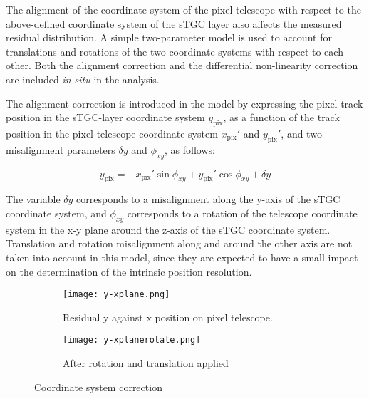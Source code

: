 The alignment of the coordinate system of the pixel telescope with respect to the above-defined coordinate system of the
sTGC layer also affects the measured residual distribution. A simple two-parameter model is used to account for
translations and rotations of the two coordinate systems with respect to each other. Both the alignment correction and
the differential non-linearity correction are included {\it in situ} in the analysis. \par

The alignment correction is introduced in the model by expressing the pixel track position in the sTGC-layer coordinate
system $y_{\mathrm{pix}}$, as a function of the track position in the pixel telescope coordinate system
$x_{\mathrm{pix}}'$ and $y_{\mathrm{pix}}'$, and two misalignment parameters $\delta y$ and $\phi_{xy}$, as follows:

\begin{equation}
	y_{\mathrm{pix}}=-x_{\mathrm{pix}}' \sin \phi_{xy} + y_{\mathrm{pix}}'\cos \phi_{xy}+\delta y
	\end{equation}

The variable $\delta y$ corresponds to a misalignment along the y-axis of the sTGC coordinate system, and $\phi_{xy}$
corresponds to a rotation of the telescope coordinate system in the x-y plane around the z-axis of the sTGC coordinate
system. Translation and rotation misalignment along and around the other axis are not taken into account in this model,
since they are expected to have a small impact on the determination of the intrinsic position resolution.\par

	\begin{figure}[ht]
		\centering
		\hspace*{\fill}
		\begin{subfigure}[b]{0.42\textwidth}
			\centering
			\texttt{[image: y-xplane.png]}
			\caption{Residual y against x position on pixel telescope.}\label{xyplanefit}
		\end{subfigure}
		\hfill
		\begin{subfigure}[b]{0.42\textwidth}
			\centering
			\texttt{[image: y-xplanerotate.png]}
			\caption{After rotation and translation applied}\label{xrotate}
		\end{subfigure}
		\hspace*{\fill}
		\caption{Coordinate system correction}\label{rotation}
	\end{figure}
	
